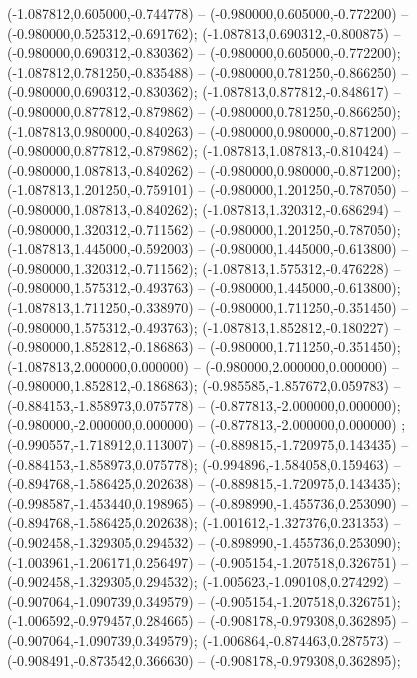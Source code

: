  (-1.087812,0.605000,-0.744778) -- (-0.980000,0.605000,-0.772200) -- (-0.980000,0.525312,-0.691762);
 (-1.087813,0.690312,-0.800875) -- (-0.980000,0.690312,-0.830362) -- (-0.980000,0.605000,-0.772200);
 (-1.087812,0.781250,-0.835488) -- (-0.980000,0.781250,-0.866250) -- (-0.980000,0.690312,-0.830362);
 (-1.087813,0.877812,-0.848617) -- (-0.980000,0.877812,-0.879862) -- (-0.980000,0.781250,-0.866250);
 (-1.087813,0.980000,-0.840263) -- (-0.980000,0.980000,-0.871200) -- (-0.980000,0.877812,-0.879862);
 (-1.087813,1.087813,-0.810424) -- (-0.980000,1.087813,-0.840262) -- (-0.980000,0.980000,-0.871200);
 (-1.087813,1.201250,-0.759101) -- (-0.980000,1.201250,-0.787050) -- (-0.980000,1.087813,-0.840262);
 (-1.087813,1.320312,-0.686294) -- (-0.980000,1.320312,-0.711562) -- (-0.980000,1.201250,-0.787050);
 (-1.087813,1.445000,-0.592003) -- (-0.980000,1.445000,-0.613800) -- (-0.980000,1.320312,-0.711562);
 (-1.087813,1.575312,-0.476228) -- (-0.980000,1.575312,-0.493763) -- (-0.980000,1.445000,-0.613800);
 (-1.087813,1.711250,-0.338970) -- (-0.980000,1.711250,-0.351450) -- (-0.980000,1.575312,-0.493763);
 (-1.087813,1.852812,-0.180227) -- (-0.980000,1.852812,-0.186863) -- (-0.980000,1.711250,-0.351450);
 (-1.087813,2.000000,0.000000) -- (-0.980000,2.000000,0.000000) -- (-0.980000,1.852812,-0.186863);
 (-0.985585,-1.857672,0.059783) -- (-0.884153,-1.858973,0.075778) -- (-0.877813,-2.000000,0.000000);
 (-0.980000,-2.000000,0.000000) -- (-0.877813,-2.000000,0.000000) ;
 (-0.990557,-1.718912,0.113007) -- (-0.889815,-1.720975,0.143435) -- (-0.884153,-1.858973,0.075778);
 (-0.994896,-1.584058,0.159463) -- (-0.894768,-1.586425,0.202638) -- (-0.889815,-1.720975,0.143435);
 (-0.998587,-1.453440,0.198965) -- (-0.898990,-1.455736,0.253090) -- (-0.894768,-1.586425,0.202638);
 (-1.001612,-1.327376,0.231353) -- (-0.902458,-1.329305,0.294532) -- (-0.898990,-1.455736,0.253090);
 (-1.003961,-1.206171,0.256497) -- (-0.905154,-1.207518,0.326751) -- (-0.902458,-1.329305,0.294532);
 (-1.005623,-1.090108,0.274292) -- (-0.907064,-1.090739,0.349579) -- (-0.905154,-1.207518,0.326751);
 (-1.006592,-0.979457,0.284665) -- (-0.908178,-0.979308,0.362895) -- (-0.907064,-1.090739,0.349579);
 (-1.006864,-0.874463,0.287573) -- (-0.908491,-0.873542,0.366630) -- (-0.908178,-0.979308,0.362895);
